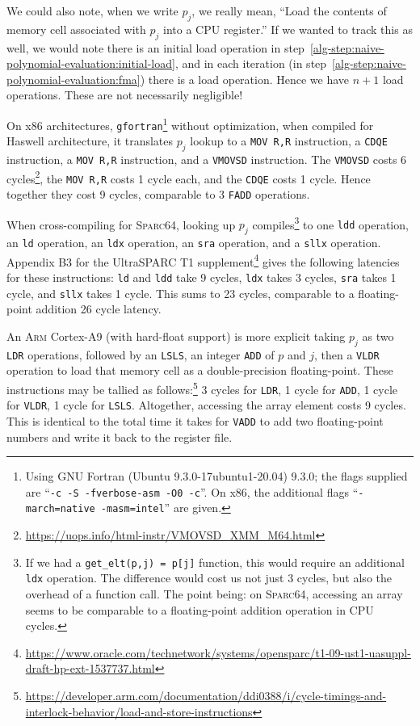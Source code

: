 \begin{rmk}
We could also note, when we write $p_{j}$, we really mean, ``Load the
contents of memory cell associated with $p_{j}$ into a CPU register.''
If we wanted to track this as well, we would note there is an initial
load operation in
step~\ref{alg-step:naive-polynomial-evaluation:initial-load}, and in
each iteration (in step~\ref{alg-step:naive-polynomial-evaluation:fma})
there is a load operation. Hence we have $n+1$ load operations. These
are not necessarily negligible!

On x86 architectures, {\tt gfortran}\footnote{Using GNU Fortran (Ubuntu
9.3.0-17ubuntu1-20.04) 9.3.0; the flags supplied are ``\texttt{-c -S
  -fverbose-asm -O0 -c}''. On x86, the additional flags
``\texttt{-march=native -masm=intel}'' are given.} without optimization,
when compiled for Haswell architecture, it translates $p_{j}$ lookup to
a \texttt{MOV R,R} instruction, a \texttt{CDQE} instruction,
a \texttt{MOV R,R} instruction, and a \texttt{VMOVSD} instruction.
The \texttt{VMOVSD} costs 6
cycles\footnote{\url{https://uops.info/html-instr/VMOVSD_XMM_M64.html}},
the \texttt{MOV R,R} costs 1 cycle each, and the \texttt{CDQE} costs 1
cycle. Hence together they cost 9 cycles, comparable to 3 \texttt{FADD} operations.

When cross-compiling for \textsc{Sparc64}, looking up $p_{j}$
compiles\footnote{If we had a \texttt{get\_elt(p,j) = p[j]} function, this
would require an additional {\tt ldx} operation. The
difference would cost us not just 3 cycles, but also the overhead of a
function call. The point being: on \textsc{Sparc64}, accessing an array
seems to be comparable to a floating-point addition operation in CPU cycles.}
to one {\tt ldd} operation, an {\tt ld} operation, an {\tt ldx}
operation, an {\tt sra} operation, and a {\tt sllx} operation. Appendix
B3 for the UltraSPARC T1 supplement\footnote{\url{https://www.oracle.com/technetwork/systems/opensparc/t1-09-ust1-uasuppl-draft-hp-ext-1537737.html}}
gives the following latencies for these instructions: {\tt ld} and {\tt ldd}
take 9 cycles, {\tt ldx} takes 3 cycles, {\tt sra} takes 1 cycle, and
{\tt sllx} takes 1 cycle. This sums to 23 cycles, comparable to a
floating-point addition 26 cycle latency.

An \textsc{Arm} Cortex-A9 (with hard-float support) is more explicit
taking $p_{j}$ as two \texttt{LDR} operations, followed by an
\texttt{LSLS}, an integer \texttt{ADD} of $p$ and $j$, then a
\texttt{VLDR} operation to load that memory cell as a double-precision
floating-point. These instructions may be tallied as follows:\footnote{\url{https://developer.arm.com/documentation/ddi0388/i/cycle-timings-and-interlock-behavior/load-and-store-instructions}}
3 cycles for \texttt{LDR}, 1 cycle for \texttt{ADD}, 1 cycle for \texttt{VLDR},
1 cycle for \texttt{LSLS}. Altogether, accessing the array element costs
9 cycles. This is identical to the total time it takes for \texttt{VADD}
to add two floating-point numbers and write it back to the register
file.


\end{rmk}
